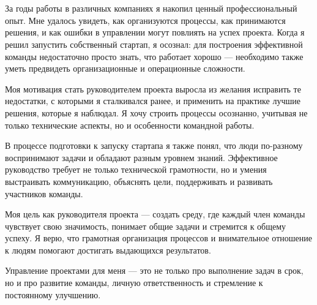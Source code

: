 \documentclass[12pt, russian]{matmex-diploma-custom}
\begin{document}

\maketitle
\section*{}
За годы работы в различных компаниях я накопил ценный профессиональный опыт. Мне удалось увидеть, как организуются процессы, как принимаются решения, и как ошибки в управлении могут повлиять на успех проекта. Когда я решил запустить собственный стартап, я осознал: для построения эффективной команды недостаточно просто знать, что работает хорошо — необходимо также уметь предвидеть организационные и операционные сложности.

Моя мотивация стать руководителем проекта выросла из желания исправить те недостатки, с которыми я сталкивался ранее, и применить на практике лучшие решения, которые я наблюдал. Я хочу строить процессы осознанно, учитывая не только технические аспекты, но и особенности командной работы.

В процессе подготовки к запуску стартапа я также понял, что люди по-разному воспринимают задачи и обладают разным уровнем знаний. Эффективное руководство требует не только технической грамотности, но и умения выстраивать коммуникацию, объяснять цели, поддерживать и развивать участников команды.

Моя цель как руководителя проекта — создать среду, где каждый член команды чувствует свою значимость, понимает общие задачи и стремится к общему успеху. Я верю, что грамотная организация процессов и внимательное отношение к людям помогают достигать выдающихся результатов.

Управление проектами для меня — это не только про выполнение задач в срок, но и про развитие команды, личную ответственность и стремление к постоянному улучшению.
\end{document}

